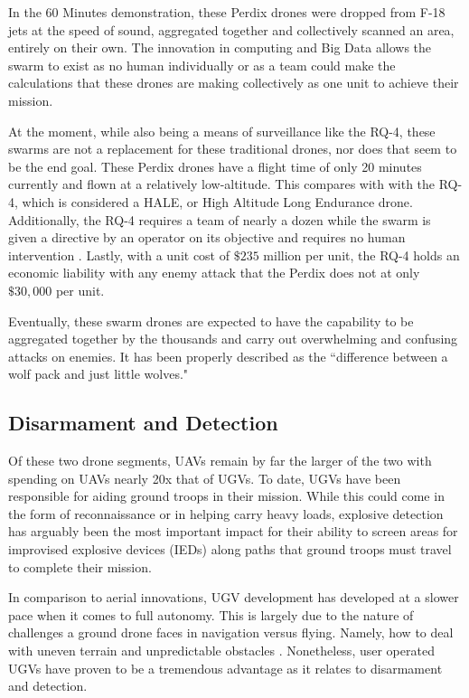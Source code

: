 \documentclass[sigconf]{acmart}
\begin{document}
In the 60 Minutes demonstration, these Perdix drones were dropped from F-18 jets at the speed of sound, aggregated together and collectively scanned an area, entirely on their own. The innovation in computing and Big Data allows the swarm to exist as no human individually or as a team could make the calculations that these drones are making collectively as one unit to achieve their mission.

 At the moment, while also being a means of surveillance like the RQ-4, these swarms are not a replacement for these traditional drones, nor does that seem to be the end goal. These Perdix drones have a flight time of only 20 minutes currently and flown at a relatively low-altitude. This compares with with the RQ-4, which is considered a HALE, or High Altitude Long Endurance drone. Additionally, the RQ-4 requires a team of nearly a dozen while the swarm is given a directive by an operator on its objective and requires no human intervention \cite{ftswarm}. Lastly, with a unit cost of $\$235$ million per unit, the RQ-4 holds an economic liability with any enemy attack that the Perdix does not at only $\$30,000$ per unit. 

Eventually, these swarm drones are expected to have the capability to be aggregated together by the thousands and carry out overwhelming and confusing attacks on enemies. It has been properly described as the ``difference between a wolf pack and just little wolves\cite{ftswarm}."

\subsection{Disarmament and Detection}
Of these two drone segments, UAVs remain by far the larger of the two with spending on UAVs nearly 20x that of UGVs\cite{dronebudget}. To date, UGVs have been responsible for aiding ground troops in their mission. While this could come in the form of reconnaissance or in helping carry heavy loads, explosive detection has arguably been the most important impact for their ability to screen areas for improvised explosive devices (IEDs) along paths that ground troops must travel to complete their mission. 

In comparison to aerial innovations, UGV development has developed at a slower pace when it comes to full autonomy. This is largely due to the nature of challenges a ground drone faces in navigation versus flying. Namely, how to deal with uneven terrain and unpredictable obstacles \cite{nytugv}. Nonetheless, user operated UGVs have proven to be a tremendous advantage as it relates to disarmament and detection.
\end{document}
